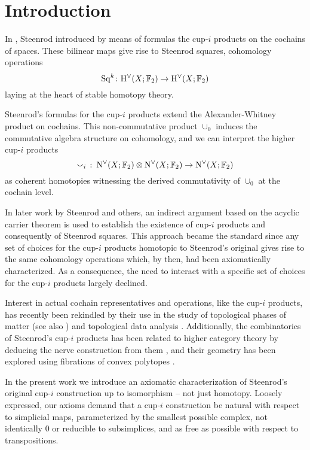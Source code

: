 
\section{Introduction} \label{s:introduction}

In \cite{steenrod1947products}, Steenrod introduced by means of formulas the \mbox{cup-$i$} products on the cochains of spaces.
These bilinear maps give rise to Steenrod squares, cohomology operations
\[
\mathrm{Sq}^k \colon \mathrm{H}^\vee(X; {\mathbb{F}_2}) \to \mathrm{H}^\vee(X; {\mathbb{F}_2})
\]
laying at the heart of stable homotopy theory.

Steenrod's formulas for the \mbox{cup-$i$} products extend the Alexander-Whitney product on cochains.
This non-commutative product $\cup_0$ induces the commutative algebra structure on cohomology, and we can interpret the higher \mbox{cup-$i$} products
\[
\smallsmile_i\ \colon \operatorname{N^{\vee}}(X; {\mathbb{F}_2}) \otimes \operatorname{N^{\vee}}(X; {\mathbb{F}_2}) \to \operatorname{N^{\vee}}(X; {\mathbb{F}_2})
\]
as coherent homotopies witnessing the derived commutativity of $\cup_0$ at the cochain level.

In later work by Steenrod \cite{steenrod1962cohomology} and others, an indirect argument based on the acyclic carrier theorem is used to establish the existence of \mbox{cup-$i$} products and consequently of Steenrod squares.
This approach became the standard since any set of choices for the \mbox{cup-$i$} products homotopic to Steenrod's original gives rise to the same cohomology operations which, by then, had been axiomatically characterized.
As a consequence, the need to interact with a specific set of choices for the \mbox{cup-$i$} products largely declined.

Interest in actual cochain representatives and operations, like the \mbox{cup-$i$} products, has recently been rekindled by their use in the study of topological phases of matter \cite{gaiotto2016spin, kapustin2017fermionic, barkeshli2021classification} (see also \cite{brumfiel2016pontrjagin,brumfiel2018pontrjagin})
and topological data analysis \cite{carlsson2005barcode, medina2018persistence}.
Additionally, the combinatorics of Steenrod's cup-$i$ products has been related to higher category theory by deducing the nerve construction from them \cite{street1987orientals, medina2020globular}, and their geometry has been explored using fibrations of convex polytopes \cite{medina2022fib_poly}.

In the present work we introduce an axiomatic characterization of Steenrod's original cup-$i$ construction up to isomorphism -- not just homotopy.
Loosely expressed, our axioms demand that a cup-$i$ construction be natural with respect to simplicial maps, parameterized by the smallest possible complex, not identically $0$ or reducible to subsimplices, and as free as possible with respect to transpositions.

